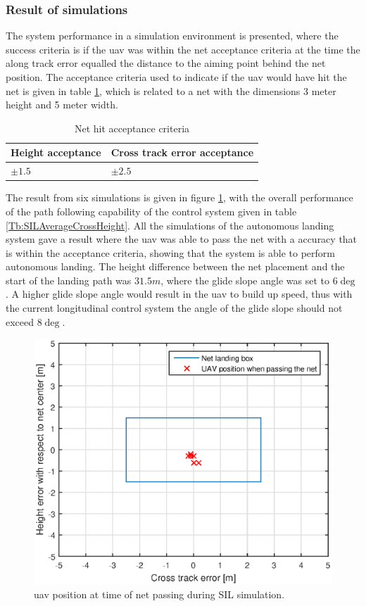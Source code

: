 \subsubsection{Result of simulations}\label{SIL:Results}
The system performance in a simulation environment is presented, where the success criteria is if the \gls{uav} was within the net acceptance criteria at the time the along track error equalled the distance to the aiming point behind the net position. The acceptance criteria used to indicate if the \gls{uav} would have hit the net is given in table \ref{tb:NetCriteria}, which is related to a net with the dimensions 3 meter height and 5 meter width.
\begin{table}[H]
\centering
\begin{tabular}{| l | l |}
\hline
\textbf{Height acceptance}	& \textbf{Cross track error acceptance}	\\ \hline
$\pm1.5$					& $\pm2.5$								\\ \hline
\end{tabular}
\caption{Net hit acceptance criteria}
\label{tb:NetCriteria}
\end{table}
The result from six simulations is given in figure \ref{Fig:SILNetPasing}, with the overall performance of the path following capability of the control system given in table \ref{Tb:SILAverageCrossHeight}. All the simulations of the autonomous landing system gave a result where the \gls{uav} was able to pass the net with a accuracy that is within the acceptance criteria, showing that the system is able to perform autonomous landing. The height difference between the net placement and the start of the landing path was $31.5 m$, where the glide slope angle was set to $6\deg$. A higher glide slope angle would result in the \gls{uav} to build up speed, thus with the current longitudinal control system the angle of the glide slope should not exceed $8\deg$.
\begin{figure}[H]
\centering
\includegraphics[scale=0.7]{figs/SysPlot/SILNetPasing.eps}
\caption{\gls{uav} position at time of net passing during SIL simulation.}
\label{Fig:SILNetPasing}
\end{figure}
